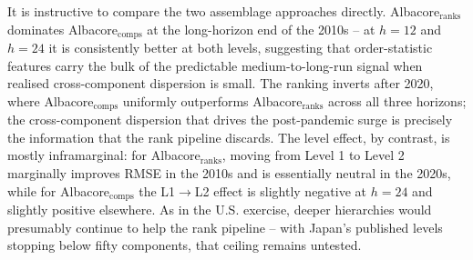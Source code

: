 It is instructive to compare the two assemblage approaches directly. Albacore$_{\text{ranks}}$ dominates Albacore$_{\text{comps}}$ at the long-horizon end of the 2010s -- at $h=12$ and $h=24$ it is consistently better at both levels, suggesting that order-statistic features carry the bulk of the predictable medium-to-long-run signal when realised cross-component dispersion is small. The ranking inverts after 2020, where Albacore$_{\text{comps}}$ uniformly outperforms Albacore$_{\text{ranks}}$ across all three horizons; the cross-component dispersion that drives the post-pandemic surge is precisely the information that the rank pipeline discards. The level effect, by contrast, is mostly inframarginal: for Albacore$_{\text{ranks}}$, moving from Level 1 to Level 2 marginally improves RMSE in the 2010s and is essentially neutral in the 2020s, while for Albacore$_{\text{comps}}$ the L1$\to$L2 effect is slightly negative at $h=24$ and slightly positive elsewhere. As in the U.S. exercise, deeper hierarchies would presumably continue to help the rank pipeline -- with Japan's published levels stopping below fifty components, that ceiling remains untested.

